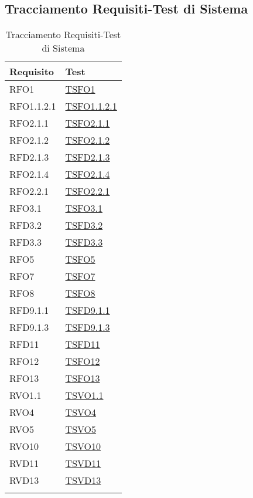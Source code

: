 \subsection{Tracciamento Requisiti-Test di Sistema}
\normalsize
\begin{longtable}{|>{\centering}m{5cm}|m{5cm}<{\centering}|}
\hline 
\textbf{Requisito} & \textbf{Test}\\
\hline
\endhead
RFO1 & \hyperlink{TSFO1}{TSFO1}\\ \hline
RFO1.1.2.1 & \hyperlink{TSFO1.1.2.1}{TSFO1.1.2.1}\\ \hline
RFO2.1.1 & \hyperlink{TSFO2.1.1}{TSFO2.1.1}\\ \hline
RFO2.1.2 & \hyperlink{TSFO2.1.2}{TSFO2.1.2}\\ \hline
RFD2.1.3 & \hyperlink{TSFD2.1.3}{TSFD2.1.3}\\ \hline
RFO2.1.4 & \hyperlink{TSFO2.1.4}{TSFO2.1.4}\\ \hline
RFO2.2.1 & \hyperlink{TSFO2.2.1}{TSFO2.2.1}\\ \hline
RFO3.1 & \hyperlink{TSFO3.1}{TSFO3.1}\\ \hline
RFD3.2 & \hyperlink{TSFD3.2}{TSFD3.2}\\ \hline
RFD3.3 & \hyperlink{TSFD3.3}{TSFD3.3}\\ \hline
RFO5 & \hyperlink{TSFO5}{TSFO5}\\ \hline
RFO7 & \hyperlink{TSFO7}{TSFO7}\\ \hline
RFO8 & \hyperlink{TSFO8}{TSFO8}\\ \hline
RFD9.1.1 & \hyperlink{TSFD9.1.1}{TSFD9.1.1}\\ \hline
RFD9.1.3 & \hyperlink{TSFD9.1.3}{TSFD9.1.3}\\ \hline
RFD11 & \hyperlink{TSFD11}{TSFD11}\\ \hline
RFO12 & \hyperlink{TSFO12}{TSFO12}\\ \hline
RFO13 & \hyperlink{TSFO13}{TSFO13}\\ \hline
RVO1.1 & \hyperlink{TSVO1.1}{TSVO1.1}\\ \hline
RVO4 & \hyperlink{TSVO4}{TSVO4}\\ \hline
RVO5 & \hyperlink{TSVO5}{TSVO5}\\ \hline
RVO10 & \hyperlink{TSVO10}{TSVO10}\\ \hline
RVD11 & \hyperlink{TSVD11}{TSVD11}\\ \hline
RVD13 & \hyperlink{TSVD13}{TSVD13}\\ \hline
\caption[Tracciamento Requisiti-Test di Sistema]{Tracciamento Requisiti-Test di Sistema}
\label{tabella:requi-tv}
\end{longtable}
\clearpage
